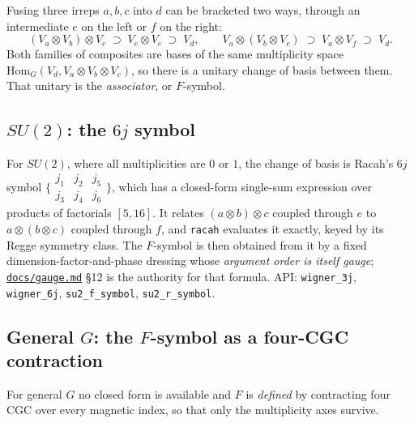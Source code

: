 \documentclass[11pt,a4paper]{article}
\theoremstyle{plain}
\theoremstyle{definition}
\newcommand{\Hom}{\mathrm{Hom}}
\newcommand{\code}[1]{\texttt{#1}}
\newcommand{\gaugemd}{\href{https://github.com/Ryo-wtnb11/racah/blob/main/docs/gauge.md}{\code{docs/gauge.md}}}
\begin{document}
Fusing three irreps $a,b,c$ into $d$ can be bracketed two ways, through an
intermediate $e$ on the left or $f$ on the right:
\[
  (V_a\otimes V_b)\otimes V_c \;\supset\; V_e\otimes V_c \;\supset\; V_d,
  \qquad
  V_a\otimes(V_b\otimes V_c) \;\supset\; V_a\otimes V_f \;\supset\; V_d .
\]
Both families of composites are bases of the same multiplicity space
$\Hom_G(V_d, V_a\otimes V_b\otimes V_c)$, so there is a unitary change of basis
between them. That unitary is the \emph{associator}, or $F$-symbol.

\subsection{$SU(2)$: the $6j$ symbol}

For $SU(2)$, where all multiplicities are $0$ or $1$, the change of basis is
Racah's $6j$ symbol
$\bigl\{\begin{smallmatrix} j_1 & j_2 & j_5 \\ j_3 & j_4 & j_6\end{smallmatrix}\bigr\}$,
which has a closed-form single-sum expression over products of factorials
$[5,16]$. It relates $(a\otimes b)\otimes c$ coupled through $e$ to
$a\otimes(b\otimes c)$ coupled through $f$, and \code{racah} evaluates it
exactly, keyed by its Regge symmetry class. The $F$-symbol is then obtained
from it by a fixed dimension-factor-and-phase dressing whose \emph{argument
order is itself gauge}; \gaugemd{} \S12 is the authority for that formula.
API: \code{wigner\_3j}, \code{wigner\_6j}, \code{su2\_f\_symbol},
\code{su2\_r\_symbol}.

\subsection{General $G$: the $F$-symbol as a four-CGC contraction}
\label{sec:fsymbol}

For general $G$ no closed form is available and $F$ is \emph{defined} by
contracting four CGC over every magnetic index, so that only the multiplicity
axes survive.
\end{document}
